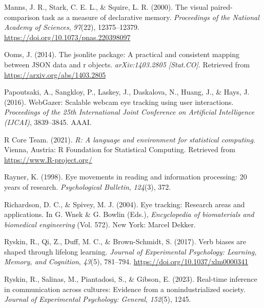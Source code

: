 \documentclass[
  man,floatsintext]{apa6}
\newlength{\cslhangindent}
\newlength{\cslentryspacingunit} %
\newenvironment{CSLReferences}[2] %
 {%
  \setlength{\parindent}{0pt}
  \ifodd #1
  \let\oldpar\par
  \def\par{\hangindent=\cslhangindent\oldpar}
  \fi
  \setlength{\parskip}{#2\cslentryspacingunit}
 }%
 {}
\begin{document}
\begin{CSLReferences}{1}{0}
\leavevmode{}%
Manns, J. R., Stark, C. E. L., \& Squire, L. R. (2000). The visual paired-comparison task as a measure of declarative memory. \emph{Proceedings of the National Academy of Sciences}, \emph{97}(22), 12375--12379. \url{https://doi.org/10.1073/pnas.220398097}

\leavevmode{}%
Ooms, J. (2014). The jsonlite package: A practical and consistent mapping between JSON data and r objects. \emph{arXiv:1403.2805 {[}Stat.CO{]}}. Retrieved from \url{https://arxiv.org/abs/1403.2805}

\leavevmode{}%
Papoutsaki, A., Sangkloy, P., Laskey, J., Daskalova, N., Huang, J., \& Hays, J. (2016). {WebGazer}: {Scalable} webcam eye tracking using user interactions. \emph{Proceedings of the 25th International Joint Conference on Artificial Intelligence ({IJCAI})}, 3839--3845. {AAAI}.

\leavevmode{}%
R Core Team. (2021). \emph{R: A language and environment for statistical computing}. Vienna, Austria: R Foundation for Statistical Computing. Retrieved from \url{https://www.R-project.org/}

\leavevmode{}%
Rayner, K. (1998). Eye movements in reading and information processing: 20 years of research. \emph{Psychological Bulletin}, \emph{124}(3), 372.

\leavevmode{}%
Richardson, D. C., \& Spivey, M. J. (2004). Eye tracking: {Research} areas and applications. In G. Wnek \& G. Bowlin (Eds.), \emph{Encyclopedia of biomaterials and biomedical engineering} (Vol. 572). New York: Marcel Dekker.

\leavevmode{}%
Ryskin, R., Qi, Z., Duff, M. C., \& Brown-Schmidt, S. (2017). Verb biases are shaped through lifelong learning. \emph{Journal of Experimental Psychology: Learning, Memory, and Cognition}, \emph{43}(5), 781--794. \url{https://doi.org/10.1037/xlm0000341}

\leavevmode{}%
Ryskin, R., Salinas, M., Piantadosi, S., \& Gibson, E. (2023). Real-time inference in communication across cultures: Evidence from a nonindustrialized society. \emph{Journal of Experimental Psychology: General}, \emph{152}(5), 1245.


\end{CSLReferences}
\end{document}
